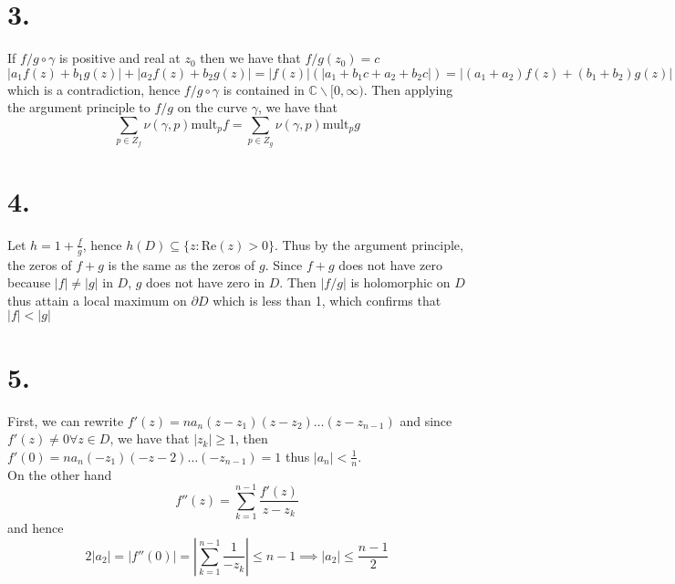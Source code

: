 \documentclass[11pt]{article}
\begin{document}
\section*{3.}
If $f/g \circ \gamma$ is positive and real at $z_0$ then we have that $f/g(z_0) = c$
\[
    |a_1f(z) + b_1g(z)| + |a_2f(z) + b_2g(z)| = |f(z)|(|a_1 + b_1c + a_2 + b_2c|) = |(a_1 + a_2)f(z) + (b_1 + b_2)g(z)|
\]
which is a contradiction, hence $f/g \circ \gamma$ is contained in $\mathbb{C} \backslash [0, \infty)$.
Then applying the argument principle to $f/g$ on the curve $\gamma$, we have that 
\[
    \sum_{p \in Z_f} \nu(\gamma, p) \text{mult}_p f = \sum_{p \in Z_g} \nu(\gamma, p) \text{mult}_p g
\]
\newpage
\section*{4.}
Let $h = 1 + \frac{f}{g}$, hence $h(D) \subseteq \{z: \text{Re}(z)> 0\}$. Thus by the argument principle, the zeros of $f+g$ is the same as the zeros of $g$. 
Since $f+g$ does not have zero because $|f|\ne |g|$ in $D$, $g$ does not have zero in $D$. Then $|f/g|$ is holomorphic on $D$ thus attain a local maximum on $\partial D$ which is less than 1, which confirms that $|f|<|g|$
\newpage
\section*{5.}
First, we can rewrite $f'(z) = n a_n(z-z_1)(z-z_2)\hdots(z-z_{n-1})$ and since $f'(z) \ne 0 \forall z \in D$, we have that $|z_k|\ge1$, 
then $f'(0) = n a_n(-z_1)(-z-2)\hdots (-z_{n-1}) = 1$ thus $|a_n| < \frac{1}{n}$. \\
On the other hand 
\[
    f''(z) = \sum_{k=1}^{n-1} \frac{f'(z)}{z-z_k}
\]
and hence 
\[
    2|a_2| = |f''(0)| = \left|\sum_{k=1}^{n-1} \frac{1}{-z_k} \right| \le n-1 \implies |a_2| \le \frac{n-1}{2}
\]
\end{document}
